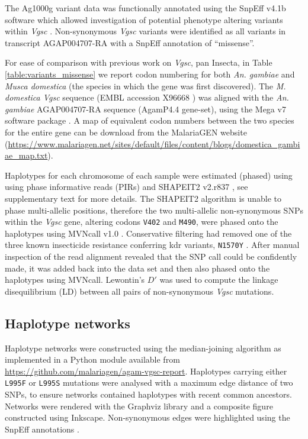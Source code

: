 \documentclass[a4paper,11pt,abstracton,hidelinks]{scrartcl}
\begin{document}
%
The Ag1000g variant data was functionally annotated using the SnpEff v4.1b software which allowed investigation of potential phenotype altering variants within \emph{Vgsc} \cite{Cingolani2012}.
%
Non-synonymous \emph{Vgsc} variants were identified as all variants in transcript AGAP004707-RA with a SnpEff annotation of “missense”.

%
For ease of comparison with previous work on \emph{Vgsc}, pan Insecta, in Table \ref{table:variants_missense} we report codon numbering for both \emph{An. gambiae} and \emph{Musca domestica} (the species in which the gene was first discovered).
%
The \emph{M. domestica Vgsc} sequence (EMBL accession X96668 \cite{Williamson1996}) was aligned with the \emph{An. gambiae} AGAP004707-RA sequence (AgamP4.4 gene-set), using the Mega v7 software package \cite{Kumar2016}.
%
A map of equivalent codon numbers between the two species for the entire gene can be download from the MalariaGEN website (\url{https://www.malariagen.net/sites/default/files/content/blogs/domestica_gambiae_map.txt}).

%
Haplotypes for each chromosome of each sample were estimated (phased) using using phase informative reads (PIRs) and SHAPEIT2 v2.r837 \cite{Delaneau2013}, see \cite{Ag1000gConsortium2017} supplementary text for more details.
%
The SHAPEIT2 algorithm is unable to phase multi-allelic positions, therefore the two multi-allelic non-synonymous SNPs within the \emph{Vgsc} gene, altering codons \texttt{V402} and \texttt{M490}, were phased onto the haplotypes using MVNcall v1.0 \cite{Menelaou2013}.
%
Conservative filtering had removed one of the three known insecticide resistance conferring kdr variants, \texttt{N1570Y} \cite{Jones2012}.
%
After manual inspection of the read alignment revealed that the SNP call could be confidently made, it was added back into the data set and then also phased onto the haplotypes using MVNcall.
%
Lewontin's $D'$ \cite{Lewontin1964} was used to compute the linkage disequilibrium (LD) between all pairs of non-synonymous \emph{Vgsc} mutations.


\subsection*{Haplotype networks}

%
Haplotype networks were constructed using the median-joining algorithm \cite{Bandelt1999} as implemented in a Python module available from \url{https://github.com/malariagen/agam-vgsc-report}.
%
Haplotypes carrying either \texttt{L995F} or \texttt{L995S} mutations were analysed with a maximum edge distance of two SNPs, to ensure networks contained haplotypes with recent common ancestors.
%
Networks were rendered with the Graphviz library and a composite figure constructed using Inkscape.
%
Non-synonymous edges were highlighted using the SnpEff annotations \cite{Cingolani2012}.
\end{document}
